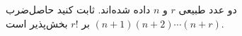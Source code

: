 \EXERCISE
دو عدد طبیعی
$r$
و
$n$
داده شده‌اند. ثابت کنید حاصل‌ضرب
$(n + 1)(n + 2) \cdots (n + r)$
بر
$r!$
بخش‌پذیر است.